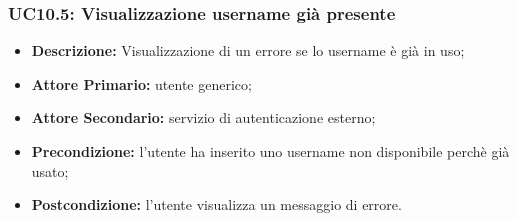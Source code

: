 \subsubsection{UC10.5: Visualizzazione username già presente}
\label{sec:UC10.5}
\begin{itemize}
    \item \textbf{Descrizione:} Visualizzazione di un errore se lo username è già in uso;
    \item \textbf{Attore Primario:} utente generico;
    \item \textbf{Attore Secondario:} servizio di autenticazione esterno;
    \item \textbf{Precondizione:} l'utente ha inserito uno username non disponibile perchè già usato;
    \item \textbf{Postcondizione:} l'utente visualizza un messaggio di errore. 
\end{itemize}
